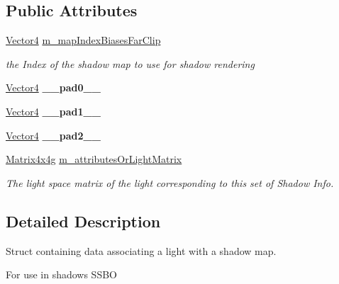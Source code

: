 \subsection*{Public Attributes}
\begin{DoxyCompactItemize}
\item 
\mbox{\hyperlink{classrev_1_1_vector}{Vector4}} \mbox{\hyperlink{structrev_1_1_shadow_info_aecab5e4cf1c5c85fa6c4a4ce619348a8}{m\+\_\+map\+Index\+Biases\+Far\+Clip}}
\begin{DoxyCompactList}\small\item\em the Index of the shadow map to use for shadow rendering \end{DoxyCompactList}\item 
\mbox{\label{structrev_1_1_shadow_info_a90595e5d6d20bd3317bd9af0d3808d6f}} 
\mbox{\hyperlink{classrev_1_1_vector}{Vector4}} {\bfseries \+\_\+\+\_\+pad0\+\_\+\+\_\+}
\item 
\mbox{\label{structrev_1_1_shadow_info_a83eb5b4432069dd59d276b747ddeaa8b}} 
\mbox{\hyperlink{classrev_1_1_vector}{Vector4}} {\bfseries \+\_\+\+\_\+pad1\+\_\+\+\_\+}
\item 
\mbox{\label{structrev_1_1_shadow_info_a32b296fa102e118c274031f046f8b495}} 
\mbox{\hyperlink{classrev_1_1_vector}{Vector4}} {\bfseries \+\_\+\+\_\+pad2\+\_\+\+\_\+}
\item 
\mbox{\label{structrev_1_1_shadow_info_a6cb0a6fb606a98aba9932904dc4dc458}} 
\mbox{\hyperlink{classrev_1_1_square_matrix}{Matrix4x4g}} \mbox{\hyperlink{structrev_1_1_shadow_info_a6cb0a6fb606a98aba9932904dc4dc458}{m\+\_\+attributes\+Or\+Light\+Matrix}}
\begin{DoxyCompactList}\small\item\em The light space matrix of the light corresponding to this set of Shadow Info. \end{DoxyCompactList}\end{DoxyCompactItemize}


\subsection{Detailed Description}
Struct containing data associating a light with a shadow map. 

For use in shadows S\+S\+BO 

